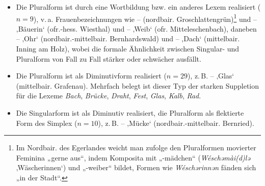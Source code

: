 \begin{itemize}
\item Die Pluralform ist durch eine Wortbildung bzw. ein anderes Lexem realisiert ($n=9$), v.\,a. Frauenbezeichnungen wie  --  (nordbair. Groschlattengrün)\footnote{Im Nordbair. des Egerlandes weicht man \citet[320]{Schiepek1908} zufolge den Pluralformen movierter Feminina „gerne aus“, indem Komposita mit „-mädchen“ (\textit{Wéschəmài(d)lə} ‚Wäscherinnen‘) und „-weiber“ bildet, Formen wie \textit{Wéschərinnən} fänden sich „in der Stadt“.} und  --  ‚Bäuerin‘ (ofr.-hess. Wiesthal) und  --  ‚Weib‘ (ofr. Mitteleschenbach), daneben  --  ‚Ohr‘ (nordbair.-mittelbair. Bernhardswald) und  --  ‚Dach‘ (mittelbair. Inning am Holz), wobei die formale Ähnlichkeit zwischen Singular- und Pluralform von Fall zu Fall stärker oder schwächer ausfällt.
\item Die Pluralform ist als Diminutivform realisiert ($n=29$), z.\,B.  --  ‚Glas‘ (mittelbair. Grafenau). Mehrfach belegt ist dieser Typ der starken Suppletion für die Lexeme \textit{Bach}, \textit{Brücke}, \textit{Draht}, \textit{Fest}, \textit{Glas}, \textit{Kalb}, \textit{Rad}.
\item Die Singularform ist als Diminutiv realisiert, die Pluralform als flektierte Form des Simplex ($n=10$), z.\,B.  --  ‚Mücke‘ (nordbair.-mittelbair. Bernried).
\end{itemize}

